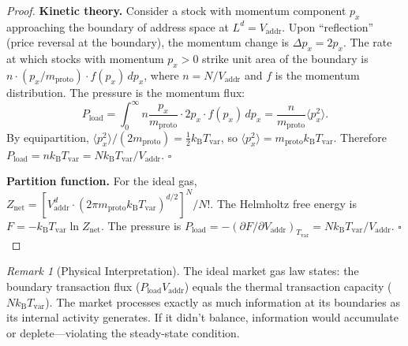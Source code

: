 \documentclass[twocolumn,10pt]{article}
\theoremstyle{remark}
\newtheorem{remark}[theorem]{Remark}
\newcommand{\kB}{k_{\mathrm{B}}}
\newcommand{\Tvar}{T_{\mathrm{var}}}
\newcommand{\Pload}{P_{\mathrm{load}}}
\newcommand{\Vaddr}{V_{\mathrm{addr}}}
\newcommand{\mproto}{m_{\mathrm{proto}}}
\newcommand{\Znet}{Z_{\mathrm{net}}}
\begin{document}
\begin{proof}
\textbf{Kinetic theory.}  Consider a stock with momentum component $p_x$ approaching the boundary of address space at $L^d = \Vaddr$.  Upon ``reflection'' (price reversal at the boundary), the momentum change is $\Delta p_x = 2p_x$.  The rate at which stocks with momentum $p_x > 0$ strike unit area of the boundary is $n \cdot (p_x/\mproto) \cdot f(p_x) \, dp_x$, where $n = N/\Vaddr$ and $f$ is the momentum distribution.  The pressure is the momentum flux:
\begin{equation}
    \Pload = \int_0^\infty n \frac{p_x}{\mproto} \cdot 2p_x \cdot f(p_x) \, dp_x = \frac{n}{\mproto} \langle p_x^2 \rangle.
\end{equation}
By equipartition, $\langle p_x^2 \rangle / (2\mproto) = \frac{1}{2} \kB \Tvar$, so $\langle p_x^2 \rangle = \mproto \kB \Tvar$.  Therefore $\Pload = n \kB \Tvar = N \kB \Tvar / \Vaddr$.  $\square$

\textbf{Partition function.}  For the ideal gas, $\Znet = [\Vaddr^d \cdot (2\pi \mproto \kB \Tvar)^{d/2}]^N / N!$.  The Helmholtz free energy is $F = -\kB \Tvar \ln \Znet$.  The pressure is $\Pload = -(\partial F / \partial \Vaddr)_{\Tvar} = N \kB \Tvar / \Vaddr$.  $\square$
\end{proof}

\begin{remark}[Physical Interpretation]
The ideal market gas law states: the boundary transaction flux ($\Pload \Vaddr$) equals the thermal transaction capacity ($N \kB \Tvar$).  The market processes exactly as much information at its boundaries as its internal activity generates.  If it didn't balance, information would accumulate or deplete---violating the steady-state condition.
\end{remark}
\end{document}
